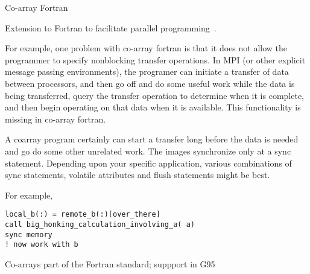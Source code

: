 
 {Co-array Fortran}

Extension to Fortran to facilitate parallel programming~\cite{coarray}.

For example, one problem with co-array fortran is that it does not
allow the programmer to specify nonblocking transfer operations. In
MPI (or other explicit message passing environments), the programer
can initiate a transfer of data between processors, and then go off
and do some useful work while the data is being transferred, query
the transfer operation to determine when it is complete, and then
begin operating on that data when it is available. This
functionality is missing in co-array fortran.

A coarray program certainly can start a transfer long before
the data is needed and go do some other unrelated work.
The images synchronize only at a sync statement.
Depending upon your specific application, various combinations
of sync statements, volatile attributes and flush statements
might be best.

For example,

\begin{verbatim}
local_b(:) = remote_b(:)[over_there]
call big_honking_calculation_involving_a( a)
sync memory
! now work with b
\end{verbatim}

Co-arrays part of the Fortran standard;
suppport in G95~\cite{g95coarray}
